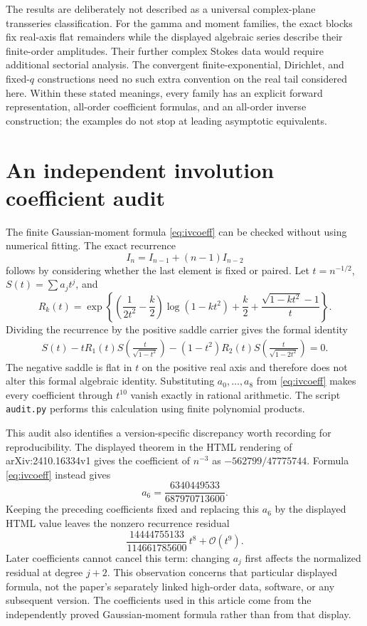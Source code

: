 \documentclass[11pt,a4paper]{article}
\theoremstyle{definition}
\theoremstyle{remark}
\newcommand{\OO}{\mathcal O}
\numberwithin{equation}{section}
\begin{document}
The results are deliberately not described as a universal complex-plane transseries classification. For the gamma and moment families, the exact blocks fix real-axis flat remainders while the displayed algebraic series describe their finite-order amplitudes. Their further complex Stokes data would require additional sectorial analysis. The convergent finite-exponential, Dirichlet, and fixed-$q$ constructions need no such extra convention on the real tail considered here. Within these stated meanings, every family has an explicit forward representation, all-order coefficient formulas, and an all-order inverse construction; the examples do not stop at leading asymptotic equivalents.

\appendix
\section{An independent involution coefficient audit}
\label{app:audit}
The finite Gaussian-moment formula \eqref{eq:ivcoeff} can be checked without using numerical fitting. The exact recurrence
\[
 I_n=I_{n-1}+(n-1)I_{n-2}
\]
follows by considering whether the last element is fixed or paired. Let $t=n^{-1/2}$, $S(t)=\sum a_jt^j$, and
\begin{equation}
 R_k(t)=\exp\left\{
 \left(\frac1{2t^2}-\frac k2\right)\log(1-kt^2)+\frac k2
 +\frac{\sqrt{1-kt^2}-1}{t}\right\}.
 \label{eq:auditR}
\end{equation}
Dividing the recurrence by the positive saddle carrier gives the formal identity
\begin{align}
 S(t)-tR_1(t)S\!\left(\frac{t}{\sqrt{1-t^2}}\right)
 -(1-t^2)R_2(t)S\!\left(\frac{t}{\sqrt{1-2t^2}}\right)=0.
 \label{eq:auditrec}
\end{align}
The negative saddle is flat in $t$ on the positive real axis and therefore does not alter this formal algebraic identity. Substituting $a_0,\ldots,a_8$ from \eqref{eq:ivcoeff} makes every coefficient through $t^{10}$ vanish exactly in rational arithmetic. The script \texttt{audit.py} performs this calculation using finite polynomial products.

This audit also identifies a version-specific discrepancy worth recording for reproducibility. The displayed theorem in the HTML rendering of arXiv:2410.16334v1 \cite{ekz} gives the coefficient of $n^{-3}$ as $-562799/47775744$. Formula \eqref{eq:ivcoeff} instead gives
\[
 a_6=\frac{6340449533}{687970713600}.
\]
Keeping the preceding coefficients fixed and replacing this $a_6$ by the displayed HTML value leaves the nonzero recurrence residual
\begin{equation}
 \frac{14444755133}{114661785600}\,t^8+\OO(t^9).
 \label{eq:auditdiscrepancy}
\end{equation}
Later coefficients cannot cancel this term: changing $a_j$ first affects the normalized residual at degree $j+2$. This observation concerns that particular displayed formula, not the paper's separately linked high-order data, software, or any subsequent version. The coefficients used in this article come from the independently proved Gaussian-moment formula rather than from that display.
\end{document}
